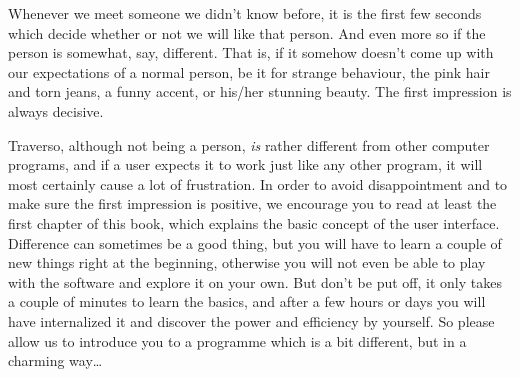 Whenever we meet someone we didn't know before, it is the first few seconds which decide whether or not we will like that person. And even more so if the person is somewhat, say, different. That is, if it somehow doesn't come up with our expectations of a normal person, be it for strange behaviour, the pink hair and torn jeans, a funny accent, or his/her stunning beauty. The first impression is always decisive.

Traverso, although not being a person, \emph{is} rather different from other computer programs, and if a user expects it to work just like any other program, it will most certainly cause a lot of frustration. In order to avoid disappointment and to make sure the first impression is positive, we encourage you to read at least the first chapter of this book, which explains the basic concept of the user interface. Difference can sometimes be a good thing, but you will have to learn a couple of new things right at the beginning, otherwise you will not even be able to play with the software and explore it on your own. But don't be put off, it only takes a couple of minutes to learn the basics, and after a few hours or days you will have internalized it and discover the power and efficiency by yourself. So please allow us to introduce you to a programme which is a bit different, but in a charming way\dots
